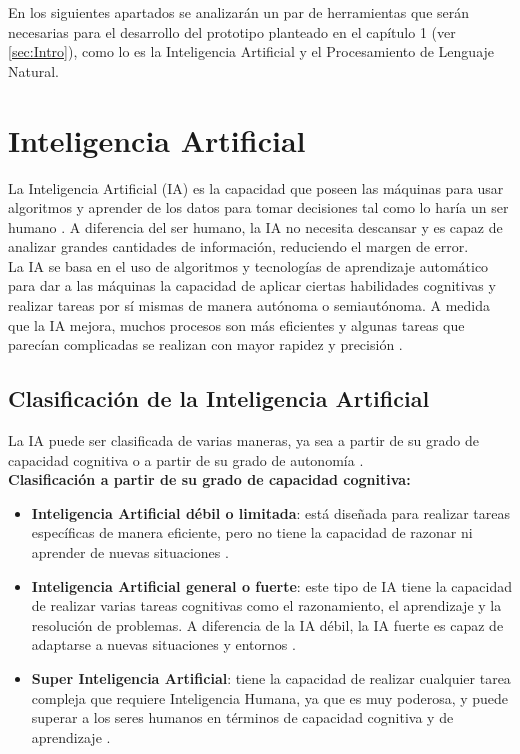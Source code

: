 En los siguientes apartados se analizarán un par de herramientas que serán necesarias para el desarrollo del prototipo planteado en el capítulo 1 (ver \autoref{sec:Intro}), como lo es la Inteligencia Artificial y el Procesamiento de Lenguaje Natural.\\

\section{Inteligencia Artificial}
La Inteligencia Artificial (IA) es la capacidad que poseen las máquinas para usar algoritmos y aprender de los datos para tomar decisiones tal como lo haría un ser humano \cite{ref41}. A diferencia del ser humano, la IA no necesita descansar y es capaz de analizar grandes cantidades de información, reduciendo el margen de error.\\

La IA se basa en el uso de algoritmos y tecnologías de aprendizaje automático para dar a las máquinas la capacidad de aplicar ciertas habilidades cognitivas y realizar tareas por sí mismas de manera autónoma o semiautónoma. A medida que la IA mejora, muchos procesos son más eficientes y algunas tareas que parecían complicadas se realizan con mayor rapidez y precisión \cite{ref42}.\\

\newpage
\subsection{Clasificación de la Inteligencia Artificial}
La IA puede ser clasificada de varias maneras, ya sea a partir de su grado de capacidad cognitiva o a partir de su grado de autonomía \cite{ref42}.\\

\textbf{Clasificación a partir de su grado de capacidad cognitiva:}
\begin{itemize}
    \item \textbf{Inteligencia Artificial débil o limitada}: está diseñada para realizar tareas específicas de manera eficiente, pero no tiene la capacidad de razonar ni aprender de nuevas situaciones \cite{ref42}.\\
    \item \textbf{Inteligencia Artificial general o fuerte}: este tipo de IA tiene la capacidad de realizar varias tareas cognitivas como el razonamiento, el aprendizaje y la resolución de problemas. A diferencia de la IA débil, la IA fuerte es capaz de adaptarse a nuevas situaciones y entornos \cite{ref42}.\\
    \item \textbf{Super Inteligencia Artificial}: tiene la capacidad de realizar cualquier tarea compleja que requiere Inteligencia Humana, ya que es muy poderosa, y puede superar a los seres humanos en términos de capacidad cognitiva y de aprendizaje \cite{ref42}.\\
\end{itemize}

